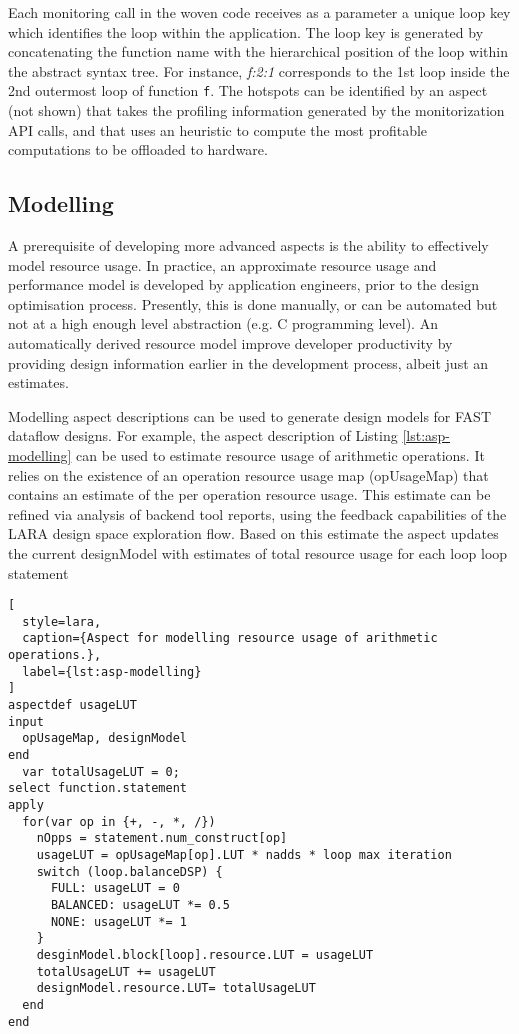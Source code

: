 Each monitoring call in the woven code receives as a parameter a
unique loop key which identifies the loop within the application. The
loop key is generated by concatenating the function name with the
hierarchical position of the loop within the abstract syntax tree. For
instance, \emph{f:2:1} corresponds to the 1st loop inside the 2nd
outermost loop of function \texttt{f}. The hotspots can be identified
by an aspect (not shown) that takes the profiling information
generated by the monitorization API calls, and that uses an heuristic
to compute the most profitable computations to be offloaded to
hardware.

\subsection{Modelling}

A prerequisite of developing more advanced aspects is the ability to
effectively model resource usage. In practice, an approximate resource
usage and performance model is developed by application engineers,
prior to the design optimisation process. Presently, this is done
manually, or can be automated but not at a high enough level
abstraction (e.g. C programming level). An automatically derived
resource model improve developer productivity by providing design
information earlier in the development process, albeit just an
estimates.

Modelling aspect descriptions can be used to generate design models
for FAST dataflow designs.  For example, the aspect description of
Listing \ref{lst:asp-modelling} can be used to estimate resource usage
of arithmetic operations. It relies on the existence of an operation
resource usage map (opUsageMap) that contains an estimate of the per
operation resource usage. This estimate can be refined via analysis of
backend tool reports, using the feedback capabilities of the LARA
design space exploration flow. Based on this estimate the aspect
updates the current designModel with estimates of total resource usage
for each loop loop statement

\begin{lstlisting}[
  style=lara,
  caption={Aspect for modelling resource usage of arithmetic operations.},
  label={lst:asp-modelling}
]
aspectdef usageLUT
input
  opUsageMap, designModel
end
  var totalUsageLUT = 0;
select function.statement
apply
  for(var op in {+, -, *, /})
    nOpps = statement.num_construct[op]
    usageLUT = opUsageMap[op].LUT * nadds * loop max iteration
    switch (loop.balanceDSP) {
      FULL: usageLUT = 0
      BALANCED: usageLUT *= 0.5
      NONE: usageLUT *= 1
    }
    desginModel.block[loop].resource.LUT = usageLUT
    totalUsageLUT += usageLUT
    designModel.resource.LUT= totalUsageLUT
  end
end
\end{lstlisting}


